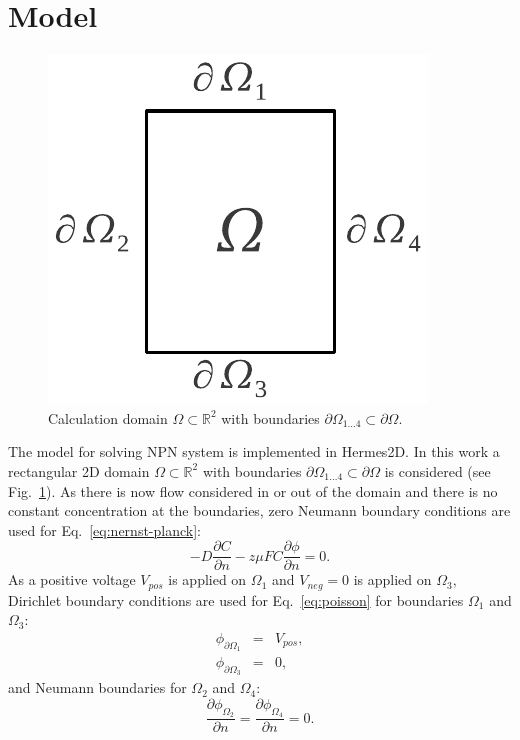 \section{Model}
\begin{figure}
  \begin{centering}
  \includegraphics[scale=0.4]{domain}
  \caption{\label{fig:domain} Calculation domain $\Omega\subset\mathbb{R}^2$
  	with boundaries $\partial\Omega_{1\ldots 4}\subset\partial\Omega$.}
  \end{centering}
\end{figure}

The model for solving NPN system is implemented in Hermes2D. In this work
a rectangular 2D domain $\Omega\subset\mathbb{R}^2$ with boundaries 
$\partial\Omega_{1\ldots 4}\subset\partial\Omega$  is considered (see Fig.~\ref{fig:domain}). 
As there is now flow considered in or out of the domain and there is no
constant concentration at the boundaries, zero Neumann boundary conditions are used 
for Eq.~\eqref{eq:nernst-planck}:
\begin{equation}
  -D \frac{\partial C}{\partial n} - z \mu F C \frac{\partial \phi} {\partial n} = 0.
  \label{eq:nernst-planck-boundary}
\end{equation}
As a positive voltage $V_{pos}$ is applied on $\Omega_1$ and $V_{neg}=0$ is applied
on $\Omega_3$, Dirichlet boundary conditions are used for Eq.~\eqref{eq:poisson} for
boundaries $\Omega_1$ and $\Omega_3$:
\begin{eqnarray}
  \phi_{\partial\Omega_1}&=&V_{pos},\\
  \phi_{\partial\Omega_3}&=&0,
  \label{eq:dirichlet}
\end{eqnarray}
and Neumann boundaries for $\Omega_2$ and $\Omega_4$:
\begin{equation}
  \frac{\partial \phi_{\Omega_2}}{\partial n}=\frac{\partial \phi_{\Omega_4}}{\partial n}=0.
\end{equation}



